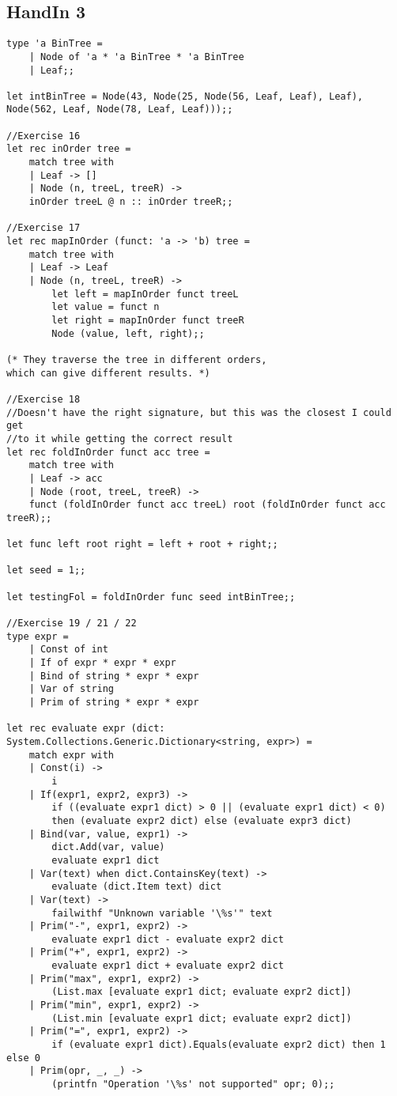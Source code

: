 \subsection{HandIn 3}
\label{Appendix_FSharp_Grooss_3}
\begin{lstlisting}
type 'a BinTree =
    | Node of 'a * 'a BinTree * 'a BinTree
    | Leaf;;

let intBinTree = Node(43, Node(25, Node(56, Leaf, Leaf), Leaf),
Node(562, Leaf, Node(78, Leaf, Leaf)));;

//Exercise 16
let rec inOrder tree =
    match tree with
    | Leaf -> []
    | Node (n, treeL, treeR) ->
    inOrder treeL @ n :: inOrder treeR;;

//Exercise 17
let rec mapInOrder (funct: 'a -> 'b) tree =
    match tree with
    | Leaf -> Leaf
    | Node (n, treeL, treeR) ->
        let left = mapInOrder funct treeL
        let value = funct n
        let right = mapInOrder funct treeR
        Node (value, left, right);;

(* They traverse the tree in different orders,
which can give different results. *)

//Exercise 18
//Doesn't have the right signature, but this was the closest I could get
//to it while getting the correct result
let rec foldInOrder funct acc tree =
    match tree with
    | Leaf -> acc
    | Node (root, treeL, treeR) -> 
    funct (foldInOrder funct acc treeL) root (foldInOrder funct acc treeR);;

let func left root right = left + root + right;;

let seed = 1;;

let testingFol = foldInOrder func seed intBinTree;;

//Exercise 19 / 21 / 22
type expr =
    | Const of int
    | If of expr * expr * expr
    | Bind of string * expr * expr
    | Var of string
    | Prim of string * expr * expr

let rec evaluate expr (dict: 
System.Collections.Generic.Dictionary<string, expr>) =
    match expr with
    | Const(i) -> 
        i
    | If(expr1, expr2, expr3) ->
        if ((evaluate expr1 dict) > 0 || (evaluate expr1 dict) < 0) 
        then (evaluate expr2 dict) else (evaluate expr3 dict)
    | Bind(var, value, expr1) ->
        dict.Add(var, value)
        evaluate expr1 dict
    | Var(text) when dict.ContainsKey(text) ->
        evaluate (dict.Item text) dict
    | Var(text) -> 
        failwithf "Unknown variable '\%s'" text
    | Prim("-", expr1, expr2) -> 
        evaluate expr1 dict - evaluate expr2 dict
    | Prim("+", expr1, expr2) -> 
        evaluate expr1 dict + evaluate expr2 dict
    | Prim("max", expr1, expr2) -> 
        (List.max [evaluate expr1 dict; evaluate expr2 dict])
    | Prim("min", expr1, expr2) -> 
        (List.min [evaluate expr1 dict; evaluate expr2 dict])
    | Prim("=", expr1, expr2) -> 
        if (evaluate expr1 dict).Equals(evaluate expr2 dict) then 1 else 0
    | Prim(opr, _, _) -> 
        (printfn "Operation '\%s' not supported" opr; 0);;


\end{lstlisting}
